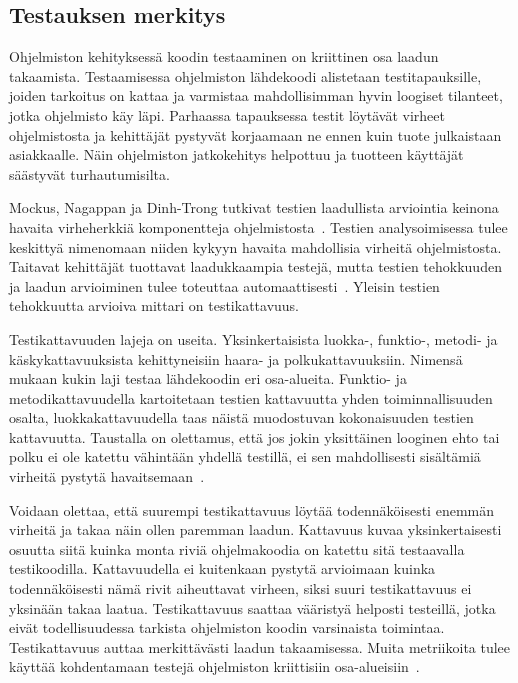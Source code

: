 \documentclass[finnish]{../tktltiki2}
\theoremstyle{definition}
\theoremstyle{remark}
\begin{document}
\subsection{Testauksen merkitys}

Ohjelmiston kehityksessä koodin testaaminen on kriittinen osa laadun takaamista. Testaamisessa ohjelmiston lähdekoodi 
alistetaan testitapauksille, joiden tarkoitus on kattaa ja varmistaa mahdollisimman hyvin loogiset tilanteet, jotka 
ohjelmisto käy läpi. Parhaassa tapauksessa testit löytävät virheet ohjelmistosta ja kehittäjät pystyvät korjaamaan ne 
ennen kuin tuote julkaistaan asiakkaalle. Näin ohjelmiston jatkokehitys helpottuu ja tuotteen käyttäjät säästyvät 
turhautumisilta.

    Mockus, Nagappan ja Dinh-Trong tutkivat testien laadullista arviointia keinona havaita virheherkkiä komponentteja 
ohjelmistosta~\cite{MNDT09}. Testien analysoimisessa tulee keskittyä nimenomaan niiden kykyyn havaita mahdollisia 
virheitä ohjelmistosta. Taitavat kehittäjät tuottavat laadukkaampia testejä, mutta testien tehokkuuden ja laadun 
arvioiminen tulee toteuttaa automaattisesti~\cite{MNDT09}. Yleisin testien tehokkuutta arvioiva mittari on 
testikattavuus.

    Testikattavuuden lajeja on useita. Yksinkertaisista luokka-, funktio-, metodi- ja käskykattavuuksista kehittyneisiin 
haara- ja polkukattavuuksiin. Nimensä mukaan kukin laji testaa lähdekoodin eri osa-alueita. Funktio- ja 
metodikattavuu\-della kartoitetaan testien kattavuutta yhden toiminnallisuuden osalta, luokkakattavuudella taas näistä 
muodostuvan kokonaisuuden testien kattavuutta. Taustalla on olettamus, että jos jokin yksittäinen looginen ehto tai 
polku ei ole katettu vähintään yhdellä testillä, ei sen mahdollisesti sisältämiä virheitä pystytä 
havaitsemaan~\cite{MNDT09}.

    Voidaan olettaa, että suurempi testikattavuus löytää todennäköisesti enemmän virheitä ja takaa näin ollen paremman 
laadun. Kattavuus kuvaa yksinkertaisesti osuutta siitä kuinka monta riviä ohjelmakoodia on katettu sitä testaavalla 
testikoodilla. Kattavuudella ei kuitenkaan pystytä arvioimaan kuinka todennäköisesti nämä rivit aiheuttavat virheen, 
siksi suuri testikattavuus ei yksinään takaa laatua. Testikattavuus saattaa vääristyä helposti testeillä, jotka eivät 
todellisuudessa tarkista ohjelmiston koodin varsinaista toimintaa. Testikattavuus auttaa merkittävästi laadun 
takaamisessa. Muita metriikoita tulee käyttää kohdentamaan testejä ohjelmiston kriittisiin 
osa-alueisiin~\cite{NB07, MNDT09, YH11}.
\end{document}
